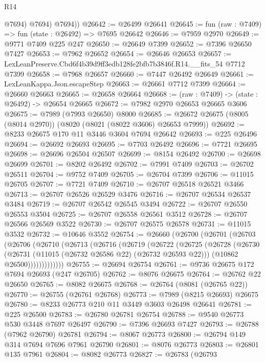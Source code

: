\begin{lexlean}{R14}
\begin{coremodule}
            @7694)
          @7694)
        @7694))
@26642 := @26499 @26641
@26645 := fun (raw : @7409) => fun (state : @26492) => @7695 @26642
@26646 := @7959 @2970
@26649 := @9771 @7409 @225 @247
@26650 := @26649 @7399
@26652 := @7396 @26650 @7427
@26653 := @7962 @26652
@26654 := @26646 @26653
@26657 := LexLeanPreserve.Cbd6f4b39d9ff3edb128fe2bfb7b3846f.R14.__fits_54 @7712 @7399
@26658 := @7968 @26657
@26660 := @7447 @26492 @26649
@26661 := LexLeanKappa.Json.escapeStep
@26663 := @26661 @7712 @7399
@26664 := @26660 @26663
@26665 := @26658 @26664
@26668 := (raw : @7409) -> (state : @26492) -> @26654 @26665
@26672 := @7982 @2970 @26653 @26665 @3606
@26675 := @7989 (@7993 @26650) @8000
@26685 := @26672 @26675 (@8005 (@8014 @2970)) (@8020 (@8021 (@8022 @3606) @26653 @7999))
@26692 := @8233 @26675 @170 @11 @3446 @3604 @7694 @26642
@26693 := @225 @26496
@26694 := @26692 @26693
@26695 := @7703 @26492
@26696 := @7721 @26695
@26698 := @26696 @26504 @26507
@26699 := @8154 @26492
@26700 := @26698 @26699
@26701 := @8202 @26492
@26702 := @7991 @7409
@26703 := @26702 @26511
@26704 := @9752 @7409
@26705 := @26704 @7399
@26706 := @11015 @26705
@26707 := @7721 @7409
@26710 := @26707 @26518 @26521 @3466
@26713 := @26707 @26526 @26529 @3476
@26716 := @26707 @26534 @26537 @3484
@26719 := @26707 @26542 @26545 @3494
@26722 := @26707 @26550 @26553 @3504
@26725 := @26707 @26558 @26561 @3512
@26728 := @26707 @26566 @26569 @3522
@26730 := @26707 @26575 @26578
@26731 := @11015 @3532
@26732 := @10646 @3552
@26754 := @26660
    (@26700
      (@26701
        (@26703
          (@26706
            (@26710
              (@26713
                (@26716
                  (@26719
                    (@26722
                      (@26725
                        (@26728
                          (@26730
                            (@26731 (@11015 (@26732 @26586 @22) (@26732 @26593 @22)))
                            (@10862 @26500)))))))))))))
@26755 := @26694 @26754
@26761 := @9736 @26675 @172 @7694 @26693 (@247 @26705)
@26762 := @8076 @26675
@26764 := @26762 @22 @26650
@26765 := @8082 @26675
@26768 := @26764 (@8081 (@26765 @22))
@26770 := @26755 (@26761 @26768)
@26773 := @7989 (@8215 @26693) @26675
@26780 := @8233 @26773 @210 @11 @3449 @3603 @26498 @26641
@26781 := @225 @26500
@26783 := @26780 @26781 @26754
@26788 := @9540 @26773 @530 @3448 @7697 @26497
@26790 := @7396 @26693 @7427
@26793 := @26788 (@7962 @26790) @26781
@26794 := @8067 @26773
@26800 := @26794 @149 @314 @7694 @7696 @7961 @26790
@26801 := @8076 @26773
@26803 := @26801 @135 @7961
@26804 := @8082 @26773
@26827 := @26783
    (@26793

\end{coremodule}
\end{lexlean}
